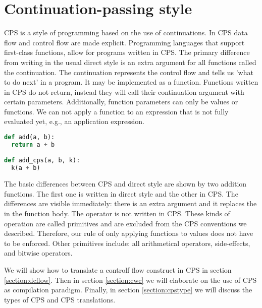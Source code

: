 
\chapter{\label{chap:cps}Continuation-passing style}
\ac{CPS}\autocite{steel1975scheme} is a style of programming based on the use of continuations. In \ac{CPS} data flow and control flow are made explicit. Programming languages that support first-class functions, allow for programs written in \ac{CPS}. The primary difference from writing in the usual direct style is an extra argument for all functions called the continuation. The continuation represents the control flow and tells us 'what to do next' in a program. It may be implemented as a function. Functions written in \ac{CPS} do not return, instead they will call their continuation argument with certain parameters. Additionally, function parameters can only be values or functions. We can not apply a function to an expression that is not fully evaluated yet, e.g., an application expression. 

\begin{lstlisting}[language=Python]
def add(a, b):
  return a + b

def add_cps(a, b, k):
  k(a + b)           
\end{lstlisting}

The basic differences between \ac{CPS} and direct style are shown by two addition functions. The first one is written in direct style and the other in \ac{CPS}. The differences are visible immediately: there is an extra argument  and it replaces the  in the function body. The \lstinlineb{+} operator is not written in \ac{CPS}. These kinds of operation are called primitives and are excluded from the \ac{CPS} conventions we described. Therefore, our rule of only applying functions to values does not have to be enforced. Other primitives include: all arithmetical operators, side-effects, and bitwise operators.

We will show how to translate a controlf flow construct in \ac{CPS} in section \ref{section:dcflow}. Then in section \ref{section:cwc} we will elaborate on the use of \ac{CPS} as compilation paradigm. Finally, in section \ref{section:cpstype} we will discuss the types of \ac{CPS} and \ac{CPS} translations.

